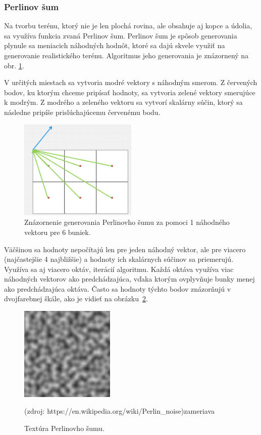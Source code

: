 \documentclass[12pt]{article}
\begin{document}
\subsubsection{Perlinov šum}

Na tvorbu terénu, ktorý nie je len plochá rovina, ale obsahuje aj kopce a údolia,
sa využíva funkcia zvaná Perlinov šum.
Perlinov šum je spôsob generovania plynule sa meniacich náhodných
hodnôt, ktoré sa dajú skvele využiť na generovanie realistického terénu.
Algoritmus jeho generovania je znázornený na obr. \ref{obr:perlinov sum}.

V určitých miestach sa vytvoria modré vektory s náhodným smerom.
Z červených bodov, ku ktorým chceme pripísať hodnoty,
sa vytvoria zelené vektory smerujúce k modrým.
Z modrého a zeleného vektoru sa vytvorí skalárny súčin, ktorý sa následne
pripíše prislúchajúcemu červenému bodu.

\begin{figure}[ht]
	\centering
	\captionsetup{justification=centering}
	\includegraphics[width=0.5\textwidth]{res/prelinov_sum.png}
	\caption{Znázornenie generovania Perlinovho šumu za pomoci 1 náhodného
		vektoru pre 6 buniek.}
	\label{obr:perlinov sum}
\end{figure}

Väčšinou sa hodnoty nepočítajú len pre jeden náhodný vektor,
ale pre viacero (najčastejšie 4 najbližšie) a hodnoty ich skalárnych
súčinov sa priemerujú. Využíva sa aj viacero oktáv, iterácií algoritmu.
Každá oktáva využíva viac náhodných vektorov ako predchádzajúca,
vďaka ktorým ovplyvňuje bunky menej ako predchádzajúca oktáva.
Často sa hodnoty týchto bodov znázorňujú v dvojfarebnej škále,
ako je vidieť na obrázku~\ref{obr:perlinov sum textura}.

\begin{figure}[ht]
	\centering
	\includegraphics[width=0.4\textwidth]{res/perlinov_sum_textura.png}
	\caption{Textúra Perlinovho šumu.}
	\footnotesize (zdroj: https://en.wikipedia.org/wiki/Perlin\_noise)zameriava 
	\label{obr:perlinov sum textura}
\end{figure}
\end{document}
